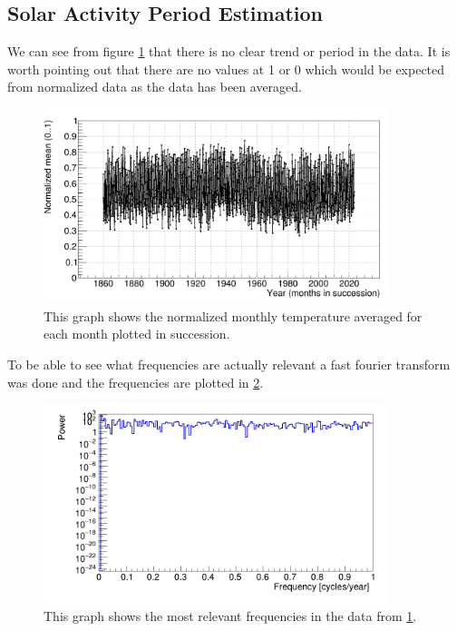 \subsection{Solar Activity Period Estimation}
We can see from figure \ref{fig:monthly_temp} that there is no clear trend or period in the data. It is worth pointing out that there are no values at 1 or 0 which would be expected from normalized data as the data has been averaged.

\begin{figure}[H]
    \centering
        \centering
        \includegraphics[width=0.9\textwidth]{../plots/solar/monthly_norm_temp_timeline.png}
        \caption{This graph shows the normalized monthly temperature averaged for each month plotted in succession.}
        \label{fig:monthly_temp}
\end{figure}
To be able to see what frequencies are actually relevant a fast fourier transform was done and the frequencies are plotted in \ref{fig:freq}.

\begin{figure}[H]
        \centering
        \includegraphics[width=0.9\textwidth]{../plots/solar/solar_frequency_analysis.png}
        \caption{This graph shows the most relevant frequencies in the data from \ref{fig:monthly_temp}.}
        \label{fig:freq}
\end{figure}


